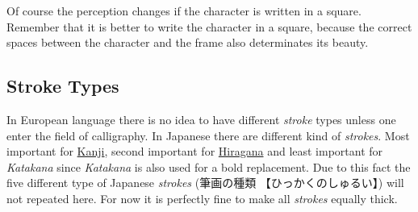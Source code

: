 
\bigskip

Of course the perception changes if the character is written in a square.
Remember that it is better to write the character in a square, because the
correct spaces between the character and the frame also determinates its
beauty.

\bigskip


\bigskip

\subsection{Stroke Types}
\label{sec:StrokeTypes}
\label{sec:Stroke}
\label{subsec:StrokeTypes}

In European language there is no idea to have different \textit{stroke} types
unless one enter the field of calligraphy. In Japanese there are different kind
of \textit{strokes}.  Most important for \hyperref[sec:Kanji]{Kanji}, second
important for \hyperref[sec:Hiragana]{Hiragana} and least important for
\textit{Katakana} since \textit{Katakana} is also used for a bold replacement.
Due to this fact the five different type of Japanese \textit{strokes}
({筆画の種類} {【ひっかくのしゅるい】}) will not repeated here. For now it is
perfectly fine to make all \textit{strokes} equally thick.


